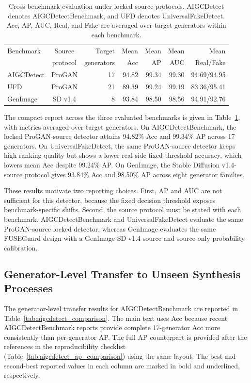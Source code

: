\documentclass[letterpaper,journal]{IEEEtran}
\begin{document}
\begin{table}[t]
\caption{Cross-benchmark evaluation under locked source protocols. AIGCDetect denotes AIGCDetectBenchmark, and UFD denotes UniversalFakeDetect. Acc, AP, AUC, Real, and Fake are averaged over target generators within each benchmark.}
\label{tab:benchmark_summary}
\centering
\small
\renewcommand{\arraystretch}{1.08}
\setlength{\tabcolsep}{2.4pt}
\begin{tabular}{@{}lcrrrrr@{}}
\toprule
Benchmark & Source & Target & Mean & Mean & Mean & Mean \\
 & protocol & generators & Acc & AP & AUC & Real/Fake \\
\midrule
AIGCDetect & ProGAN & 17 & 94.82 & 99.34 & 99.30 & 94.69/94.95 \\
UFD & ProGAN & 21 & 89.39 & 99.24 & 99.19 & 83.36/95.41 \\
GenImage & SD v1.4 & 8 & 93.84 & 98.50 & 98.56 & 94.91/92.76 \\
\bottomrule
\end{tabular}
\end{table}

The compact report across the three evaluated benchmarks is given in Table~\ref{tab:benchmark_summary}, with metrics averaged over target generators. On AIGCDetectBenchmark, the locked ProGAN-source detector attains 94.82\% Acc and 99.34\% AP across 17 generators. On UniversalFakeDetect, the same ProGAN-source detector keeps high ranking quality but shows a lower real-side fixed-threshold accuracy, which lowers mean Acc despite 99.24\% AP. On GenImage, the Stable Diffusion v1.4-source protocol gives 93.84\% Acc and 98.50\% AP across eight generator families.

These results motivate two reporting choices. First, AP and AUC are not sufficient for this detector, because the fixed decision threshold exposes benchmark-specific shifts. Second, the source protocol must be stated with each benchmark. AIGCDetectBenchmark and UniversalFakeDetect evaluate the same ProGAN-source locked detector, whereas GenImage evaluates the same FUSEGuard design with a GenImage SD v1.4 source and source-only probability calibration.

\subsection{Generator-Level Transfer to Unseen Synthesis Processes}
\label{sec:cross_generator_behavior}

The generator-level transfer results for AIGCDetectBenchmark \cite{zhong2023patchcraft} are reported in Table~\ref{tab:aigcdetect_comparison}. The main text uses Acc because recent AIGCDetectBenchmark reports provide complete 17-generator Acc more consistently than per-generator AP. The full AP counterpart is provided after the references in the reproducibility checklist (Table~\ref{tab:aigcdetect_ap_comparison}) using the same layout. The best and second-best reported values in each column are marked in bold and underlined, respectively.
\end{document}
